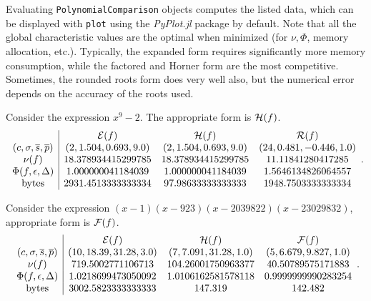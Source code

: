 \documentclass[]{elsarticle}
\begin{document}
Evaluating \verb`PolynomialComparison` objects computes the listed data, which can be displayed with \verb`plot` using the \textit{PyPlot.jl} package by default.
Note that all the global characteristic values are the optimal when minimized (for $\nu,\Phi$, memory allocation, etc.).
Typically, the expanded form requires significantly more memory consumption, while the factored and Horner form are the most competitive. Sometimes, the rounded roots form does very well also, but the numerical error depends on the accuracy of the roots used.

\begin{example}
	Consider the expression $x^9-2$.
	The appropriate form is $\mathcal{H}(f)$.
	$$\begin{array}{c|cccc}
		& \mathcal{E}(f) & \mathcal{H}(f) & \mathcal{R}(f) \\
		(c,\sigma,\overline{s},\overline{p}) & (2, 1.504, 0.693, 9.0) & (2, 1.504, 0.693, 9.0) & (24, 0.481, -0.446, 1.0) \\
		\nu(f) & 18.378934415299785 & 18.378934415299785 & 11.11841280417285 \\
		\Phi(f,\epsilon,\Delta) & 1.000000041184039 & 1.000000041184039 & 1.5646134826064557 \\
		\text{bytes} & 2931.4513333333334 & 97.98633333333333 & 1948.7503333333334
	\end{array}. $$
\end{example}

\begin{example}
	Consider the expression $(x - 1)(x - 923)(x - 2039822)(x - 23029832)$, appropriate form is $\mathcal{F}(f)$.
	$$\begin{array}{c|cccc}
		& \mathcal{E}(f) & \mathcal{H}(f) & \mathcal{F}(f) \\
		(c,\sigma,\overline{s},\overline{p}) & (10, 18.39, 31.28, 3.0) & (7, 7.091, 31.28, 1.0) & (5, 6.679, 9.827, 1.0) \\
		\nu(f) & 719.5002771106713 & 104.26001750963377 & 40.50789575171883 \\
		\Phi(f,\epsilon,\Delta) & 1.0218699473050092 & 1.0106162581578118 & 0.9999999990283254 \\
		\text{bytes} & 3002.5823333333333 & 147.319 & 142.482
	\end{array}. $$
\end{example}
\end{document}
